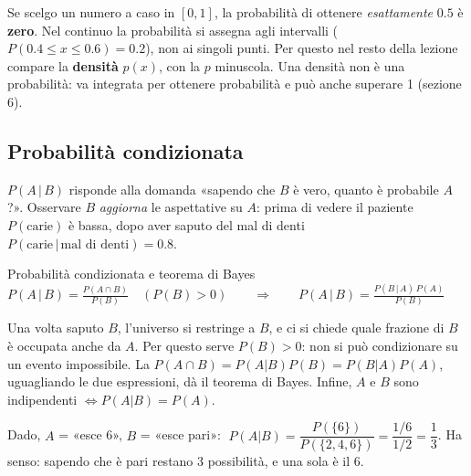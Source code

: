 \begin{attenzione}
Se scelgo un numero a caso in $[0,1]$, la probabilità di ottenere \emph{esattamente} $0.5$ è \textbf{zero}. Nel continuo la probabilità si assegna agli intervalli ($P(0.4\le x\le0.6)=0.2$), non ai singoli punti. Per questo nel resto della lezione compare la \textbf{densità} $p(x)$, con la $p$ minuscola. Una densità non è una probabilità: va integrata per ottenere probabilità e può anche superare 1 (sezione 6).
\end{attenzione}

\subsection{Probabilità condizionata}
\begin{intuizione}
$P(A\,|\,B)$ risponde alla domanda «sapendo che $B$ è vero, quanto è probabile $A$?». Osservare $B$ \emph{aggiorna} le aspettative su $A$: prima di vedere il paziente $P(\text{carie})$ è bassa, dopo aver saputo del mal di denti $P(\text{carie}\,|\,\text{mal di denti})=0.8$.
\end{intuizione}

\begin{formulat}{Probabilità condizionata e teorema di Bayes}
$\displaystyle P(A\,|\,B)=\frac{P(A\cap B)}{P(B)}\quad (P(B)>0)
\qquad\Longrightarrow\qquad
P(A\,|\,B)=\frac{P(B\,|\,A)\,P(A)}{P(B)}$
\end{formulat}

Una volta saputo $B$, l'universo si restringe a $B$, e ci si chiede quale frazione di $B$ è occupata anche da $A$. Per questo serve $P(B)>0$: non si può condizionare su un evento impossibile. La  $P(A\cap B)=P(A|B)P(B)=P(B|A)P(A)$, uguagliando le due espressioni, dà il teorema di Bayes. Infine, $A$ e $B$ sono indipendenti $\iff P(A|B)=P(A)$.

\begin{esempio}
Dado, $A$ = «esce 6», $B$ = «esce pari»:
$\;P(A|B)=\dfrac{P(\{6\})}{P(\{2,4,6\})}=\dfrac{1/6}{1/2}=\dfrac13$.
Ha senso: sapendo che è pari restano 3 possibilità, e una sola è il 6.
\end{esempio}

